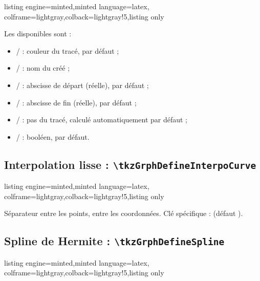 \documentclass[11pt,a4paper]{ltxdoc}
\begin{document}
\begin{tcblisting}{listing engine=minted,minted language=latex,
  colframe=lightgray,colback=lightgray!5,listing only}
\end{tcblisting}

Les \MontreCode{[clés]} disponibles sont :

\begin{itemize}
	\item {} /  : couleur du tracé,  par défaut ;
	\item {} /  : nom du  créé ;
	\item {} /  : abscisse de départ (réelle),  par défaut ;
	\item {} /  : abscisse de fin (réelle),  par défaut ;
	\item {} /  : pas du tracé, calculé automatiquement par défaut ;
	\item {} /  : booléen,  par défaut.
\end{itemize}

\subsection{Interpolation lisse : \texttt{\textbackslash tkzGrphDefineInterpoCurve}}

\begin{tcblisting}{listing engine=minted,minted language=latex,
  colframe=lightgray,colback=lightgray!5,listing only}
\end{tcblisting}

Séparateur  entre les points, \MontreCode{/} entre les coordonnées. Clé spécifique :  (défaut ).

\subsection{Spline de Hermite : \texttt{\textbackslash tkzGrphDefineSpline}}

\begin{tcblisting}{listing engine=minted,minted language=latex,
  colframe=lightgray,colback=lightgray!5,listing only}
\end{tcblisting}
\end{document}

